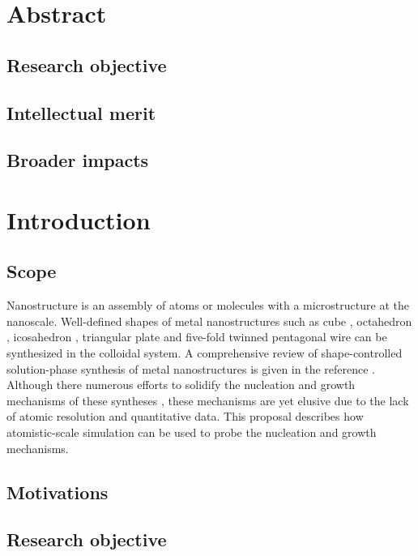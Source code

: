 \section{Abstract}

\subsection{Research objective}

\subsection{Intellectual merit}

\subsection{Broader impacts}

\section{Introduction}

\subsection{Scope}

Nanostructure is an assembly of atoms or molecules with a microstructure at the nanoscale. Well-defined shapes of metal nanostructures such as cube \cite{Im_2005}, octahedron \cite{Xia_2012}, icosahedron \cite{Xiong_2007}, triangular plate \cite{Lofton_2005} and five-fold twinned pentagonal wire \cite{Tsuji_2008} can be synthesized in the colloidal system. A comprehensive review of shape-controlled solution-phase synthesis of metal nanostructures is given in the reference \cite{Xia_2008}. Although there numerous efforts to solidify the nucleation and growth mechanisms of these syntheses \cite{Lofton_2005,Mariscal_2012,Park_2013,Viswanath_2009,Liao_2014,Chang_2011,Murph_2015}, these mechanisms are yet elusive due to the lack of atomic resolution and quantitative data. This proposal describes how atomistic-scale simulation can be used to probe the nucleation and growth mechanisms.

\subsection{Motivations}



\subsection{Research objective}

